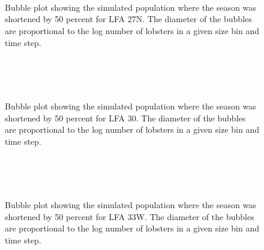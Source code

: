 \documentclass[11pt]{article}
\newcommand{\ebh}{/backup/bio_data/bio.lobster/figures/LFA2733Framework2018/} %
\begin{document}
    \begin{figure}
    \centering
                \\
                \\
                \\
        
         \caption{Bubble plot showing the simulated population where the season was shortened by 50 percent for LFA 27N. The diameter of the bubbles are proportional to the log number of lobsters in a given size bin and time step.}
    \end{figure}
    
    \begin{figure}
    \centering
                \\
                \\
                \\
        
         \caption{Bubble plot showing the simulated population where the season was shortened by 50 percent  for LFA 30. The diameter of the bubbles are proportional to the log number of lobsters in a given size bin and time step.}
    \end{figure}
    
    \begin{figure}
    \centering
                \\
                \\
                \\
        
         \caption{Bubble plot showing the simulated population where the season was shortened by 50 percent  for LFA 33W. The diameter of the bubbles are proportional to the log number of lobsters in a given size bin and time step.}
    \end{figure}
    
\end{document}
